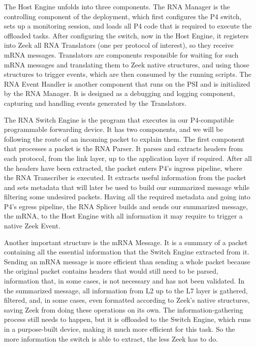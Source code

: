 The Host Engine unfolds into three components. The RNA Manager is the controlling component of the deployment, which first configures the P4 switch, sets up a monitoring session, and loads all P4 code that is required to execute the offloaded tasks. After configuring the switch, now in the Host Engine, it registers into Zeek all RNA Translators (one per protocol of interest), so they receive mRNA messages. Translators are components responsible for waiting for such mRNA messages and translating them to Zeek native structures, and using those structures to trigger events, which are then consumed by the running scripts. The RNA Event Handler is another component that runs on the PSI and is initialized by the RNA Manager. It is designed as a debugging and logging component, capturing and handling events generated by the Translators.

The RNA Switch Engine is the program that executes in our P4-compatible programmable forwarding device. It has two components, and we will be following the route of an incoming packet to explain them. The first component that processes a packet is the RNA Parser. It parses and extracts headers from each protocol, from the link layer, up to the application layer if required. After all the headers have been extracted, the packet enters P4's ingress pipeline, where the RNA Transcriber is executed. It extracts useful information from the packet and sets metadata that will later be used to build our summarized message while filtering some undesired packets. Having all the required metadata and going into P4's egress pipeline, the RNA Splicer builds and sends our summarized message, the mRNA, to the Host Engine with all information it may require to trigger a native Zeek Event.

Another important structure is the mRNA Message. It is a summary of a packet containing all the essential information that the Switch Engine extracted from it. Sending an mRNA message is more efficient than sending a whole packet because the original packet contains headers that would still need to be parsed, information that, in some cases, is not necessary and has not been validated. In the summarized message, all information from L2 up to the L7 layer is gathered, filtered, and, in some cases, even formatted according to Zeek's native structures, saving Zeek from doing these operations on its own. The information-gathering process still needs to happen, but it is offloaded to the Switch Engine, which runs in a purpose-built device, making it much more efficient for this task. So the more information the switch is able to extract, the less Zeek has to do.


